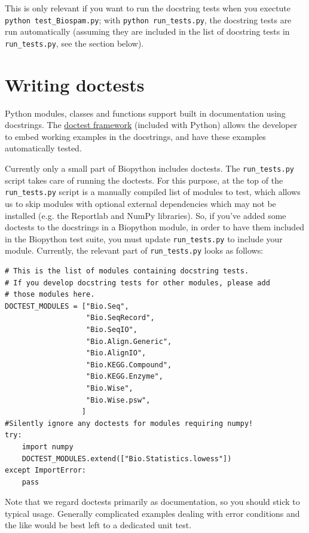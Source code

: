 \documentclass{report}
\begin{document}
This is only relevant if you want to run the docstring tests when you
exectute \verb|python test_Biospam.py|; with
\verb|python run_tests.py|, the docstring tests are run automatically
(assuming they are included in the list of docstring tests in
\verb|run_tests.py|, see the section below).

\section{Writing doctests}
\label{section:doctest}

Python modules, classes and functions support built in documentation using
docstrings.  The \href{http://docs.python.org/library/doctest.html}{doctest
framework} (included with Python) allows the developer to embed working
examples in the docstrings, and have these examples automatically tested.

Currently only a small part of Biopython includes doctests. The
\verb|run_tests.py| script takes care of running the doctests.
For this purpose, at the top of the \verb|run_tests.py| script is a
manually compiled list of modules to test, which
allows us to skip modules with optional external dependencies which may
not be installed (e.g. the Reportlab and NumPy libraries).  So, if you've
added some doctests to the docstrings in a Biopython module, in order to
have them included in the Biopython test suite, you must update
\verb|run_tests.py| to include your module. Currently, the relevant part
of \verb|run_tests.py| looks as follows:

\begin{verbatim}
# This is the list of modules containing docstring tests.
# If you develop docstring tests for other modules, please add
# those modules here.
DOCTEST_MODULES = ["Bio.Seq",
                   "Bio.SeqRecord",
                   "Bio.SeqIO",
                   "Bio.Align.Generic",
                   "Bio.AlignIO",
                   "Bio.KEGG.Compound",
                   "Bio.KEGG.Enzyme",
                   "Bio.Wise",
                   "Bio.Wise.psw",
                  ]
#Silently ignore any doctests for modules requiring numpy!
try:
    import numpy
    DOCTEST_MODULES.extend(["Bio.Statistics.lowess"])
except ImportError:
    pass
\end{verbatim}

Note that we regard doctests primarily as documentation, so you should
stick to typical usage. Generally complicated examples dealing with error
conditions and the like would be best left to a dedicated unit test.
\end{document}
